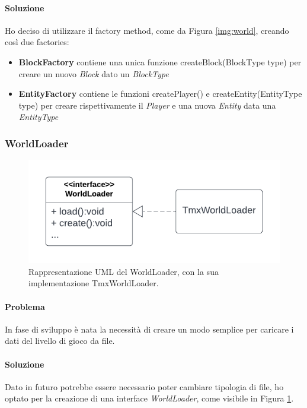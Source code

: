 \documentclass[a4paper,12pt]{report}
\begin{document}
\paragraph{Soluzione} Ho deciso di utilizzare il factory method, come da Figura  \ref{img:world}, creando così due factories:
\begin{itemize}
    \item \textbf{BlockFactory} contiene una unica funzione createBlock(BlockType type) per creare un nuovo \emph{Block} dato un \emph{BlockType}
    \item \textbf{EntityFactory} contiene le funzioni createPlayer() e createEntity(EntityType type) per creare rispettivamente il \emph{Player} e una nuova \emph{Entity} data una \emph{EntityType}
\end{itemize}

\subsubsection{WorldLoader}

\begin{figure}[H]
\centering{}
\includegraphics[scale=1] {img/worldloader.png}
\caption{Rappresentazione UML del WorldLoader, con la sua implementazione TmxWorldLoader.}
\label{img:worldloader}
\end{figure}

\paragraph{Problema} In fase di sviluppo è nata la necessità di creare un modo semplice per caricare i dati del livello di gioco da file.

\paragraph{Soluzione} Dato in futuro potrebbe essere necessario poter cambiare tipologia di file, ho optato per la creazione di una interface \emph{WorldLoader}, come visibile in Figura \ref{img:worldloader}.
\end{document}
